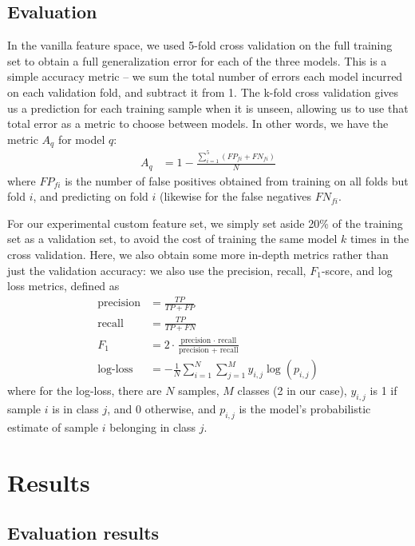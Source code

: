 \documentclass{article} %
\begin{document}
\subsection{Evaluation}
In the vanilla feature space, we used 5-fold cross validation on the full training set to obtain a full generalization error for each of the three models.  This is a simple accuracy metric -- we sum the total number of errors each model incurred on each validation fold, and subtract it from 1.  The k-fold cross validation gives us a prediction for each training sample when it is unseen, allowing us to use that total error as a metric to choose between models.  In other words, we have the metric $A_q$ for model $q$:
\begin{align*}
A_q &= 1 - \frac{\sum_{i=1}^5(FP_{fi} + FN_{fi})}{N}
\end{align*}
where $FP_{fi}$ is the number of false positives obtained from training on all folds but fold $i$, and predicting on fold $i$ (likewise for the false negatives $FN_{fi}$.\par
For our experimental custom feature set, we simply set aside 20\% of the training set as a validation set, to avoid the cost of training the same model $k$ times in the cross validation.  Here, we also obtain some more in-depth metrics rather than just the validation accuracy: we also use the precision, recall, $F_1$-score, and log loss metrics, defined as
\begin{align*}
\text{precision} &= \frac{TP}{TP + FP}\\
\text{recall} &= \frac{TP}{TP + FN}\\
F_1 &= 2 \cdot \frac{\text{precision } \cdot \text{ recall}}{\text{precision } + \text{ recall}}\\
\text{log-loss} &= -\frac{1}{N}\sum_{i=1}^N\sum_{j=1}^My_{i,j}\log(p_{i,j})
\end{align*}
where for the log-loss, there are $N$ samples, $M$ classes (2 in our case), $y_{i,j}$ is 1 if sample $i$ is in class $j$, and 0 otherwise, and $p_{i,j}$ is the model's probabilistic estimate of sample $i$ belonging in class $j$.
\section{Results}
\subsection{Evaluation results}
\end{document}
